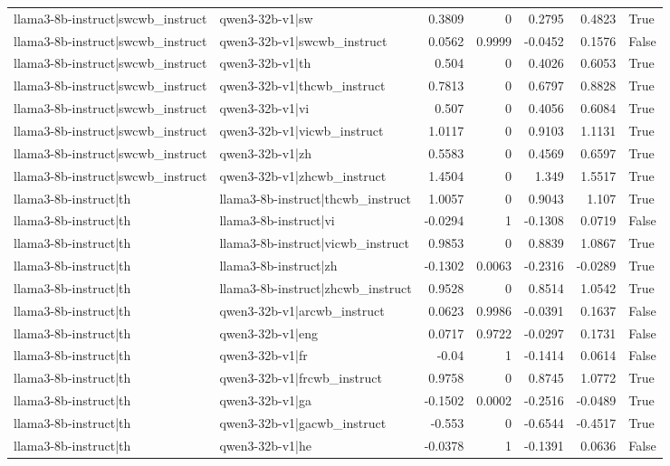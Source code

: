 \begin{table}
\begin{tabular}{l l r r r r l}
llama3-8b-instruct|swcwb_instruct & qwen3-32b-v1|sw & 0.3809 & 0 & 0.2795 & 0.4823 & True \\
llama3-8b-instruct|swcwb_instruct & qwen3-32b-v1|swcwb_instruct & 0.0562 & 0.9999 & -0.0452 & 0.1576 & False \\
llama3-8b-instruct|swcwb_instruct & qwen3-32b-v1|th & 0.504 & 0 & 0.4026 & 0.6053 & True \\
llama3-8b-instruct|swcwb_instruct & qwen3-32b-v1|thcwb_instruct & 0.7813 & 0 & 0.6797 & 0.8828 & True \\
llama3-8b-instruct|swcwb_instruct & qwen3-32b-v1|vi & 0.507 & 0 & 0.4056 & 0.6084 & True \\
llama3-8b-instruct|swcwb_instruct & qwen3-32b-v1|vicwb_instruct & 1.0117 & 0 & 0.9103 & 1.1131 & True \\
llama3-8b-instruct|swcwb_instruct & qwen3-32b-v1|zh & 0.5583 & 0 & 0.4569 & 0.6597 & True \\
llama3-8b-instruct|swcwb_instruct & qwen3-32b-v1|zhcwb_instruct & 1.4504 & 0 & 1.349 & 1.5517 & True \\
llama3-8b-instruct|th & llama3-8b-instruct|thcwb_instruct & 1.0057 & 0 & 0.9043 & 1.107 & True \\
llama3-8b-instruct|th & llama3-8b-instruct|vi & -0.0294 & 1 & -0.1308 & 0.0719 & False \\
llama3-8b-instruct|th & llama3-8b-instruct|vicwb_instruct & 0.9853 & 0 & 0.8839 & 1.0867 & True \\
llama3-8b-instruct|th & llama3-8b-instruct|zh & -0.1302 & 0.0063 & -0.2316 & -0.0289 & True \\
llama3-8b-instruct|th & llama3-8b-instruct|zhcwb_instruct & 0.9528 & 0 & 0.8514 & 1.0542 & True \\
llama3-8b-instruct|th & qwen3-32b-v1|arcwb_instruct & 0.0623 & 0.9986 & -0.0391 & 0.1637 & False \\
llama3-8b-instruct|th & qwen3-32b-v1|eng & 0.0717 & 0.9722 & -0.0297 & 0.1731 & False \\
llama3-8b-instruct|th & qwen3-32b-v1|fr & -0.04 & 1 & -0.1414 & 0.0614 & False \\
llama3-8b-instruct|th & qwen3-32b-v1|frcwb_instruct & 0.9758 & 0 & 0.8745 & 1.0772 & True \\
llama3-8b-instruct|th & qwen3-32b-v1|ga & -0.1502 & 0.0002 & -0.2516 & -0.0489 & True \\
llama3-8b-instruct|th & qwen3-32b-v1|gacwb_instruct & -0.553 & 0 & -0.6544 & -0.4517 & True \\
llama3-8b-instruct|th & qwen3-32b-v1|he & -0.0378 & 1 & -0.1391 & 0.0636 & False \\

\end{tabular}
\end{table}
